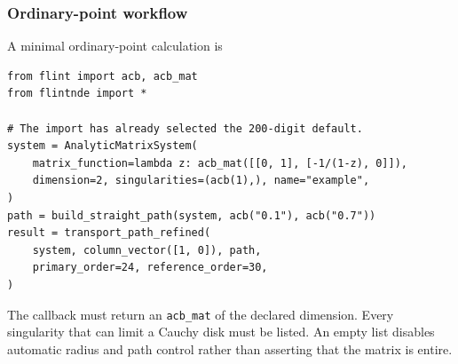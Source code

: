 \documentclass[11pt]{article}
\begin{document}
\subsubsection{Ordinary-point workflow}
\label{subsec:transport-api}

A minimal ordinary-point calculation is
\begin{verbatim}
from flint import acb, acb_mat
from flintnde import *

# The import has already selected the 200-digit default.
system = AnalyticMatrixSystem(
    matrix_function=lambda z: acb_mat([[0, 1], [-1/(1-z), 0]]),
    dimension=2, singularities=(acb(1),), name="example",
)
path = build_straight_path(system, acb("0.1"), acb("0.7"))
result = transport_path_refined(
    system, column_vector([1, 0]), path,
    primary_order=24, reference_order=30,
)
\end{verbatim}
The callback must return an \texttt{acb\_mat} of the declared dimension.  Every singularity
that can limit a Cauchy disk must be listed.  An empty list disables automatic radius and
path control rather than asserting that the matrix is entire.
\end{document}
